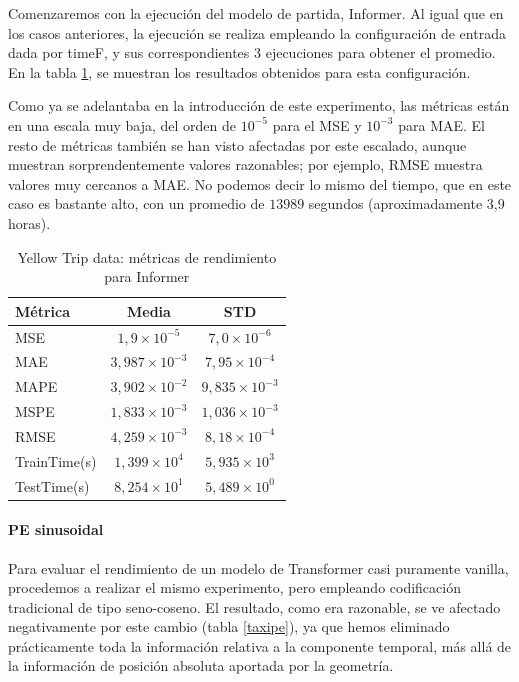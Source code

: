 Comenzaremos con la ejecución del modelo de partida, Informer. Al igual que en los casos anteriores, la ejecución se realiza empleando la configuración de entrada dada por timeF, y sus correspondientes 3 ejecuciones para obtener el promedio. En la tabla \ref{taxiinformer}, se muestran los resultados obtenidos para esta configuración. 

Como ya se adelantaba en la introducción de este experimento, las métricas están en una escala muy baja, del orden de $10^{-5}$ para el MSE y $10^{-3}$ para MAE. El resto de métricas también se han visto afectadas por este escalado, aunque muestran sorprendentemente valores razonables; por ejemplo, RMSE muestra valores muy cercanos a MAE. No podemos decir lo mismo del tiempo, que en este caso es bastante alto, con un promedio de $13989$ segundos (aproximadamente 3,9 horas).

\begin{table}[!ht]
	\centering
	\begin{tabular}{l|c|c}
		\toprule
		Métrica & Media & STD \\
		\midrule
		MSE & $1,9 \times 10^{-5}$ & $7,0 \times 10^{-6}$ \\
		MAE & $3,987 \times 10^{-3}$ & $7,95 \times 10^{-4}$ \\
		MAPE & $3,902 \times 10^{-2}$ & $9,835 \times 10^{-3}$ \\
		MSPE & $1,833 \times 10^{-3}$ & $1,036 \times 10^{-3}$ \\
		RMSE & $4,259 \times 10^{-3}$ & $8,18 \times 10^{-4}$ \\
		TrainTime(s) & $1,399 \times 10^{4}$ & $5,935 \times 10^{3}$ \\
		TestTime(s) & $8,254 \times 10^{1}$ & $5,489 \times 10^{0}$ \\
		\bottomrule
	\end{tabular}
	\caption{Yellow Trip data: métricas de rendimiento para Informer}
	\label{taxiinformer}
\end{table}

\paragraph{PE sinusoidal}

Para evaluar el rendimiento de un modelo de Transformer casi puramente vanilla, procedemos a realizar el mismo experimento, pero empleando codificación tradicional de tipo seno-coseno. El resultado, como era razonable, se ve afectado negativamente por este cambio (tabla \ref{taxipe}), ya que hemos eliminado prácticamente toda la información relativa a la componente temporal, más allá de la información de posición absoluta aportada por la geometría.\\

